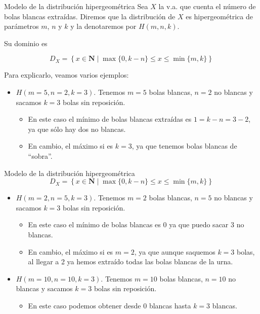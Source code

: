 \documentclass[
  ignorenonframetext,
  aspectratio=169]{beamer}
\providecommand{\tightlist}{%
  \setlength{\itemsep}{0pt}\setlength{\parskip}{0pt}}\usepackage{longtable,booktabs,array}
\begin{document}
\begin{frame}{Modelo de la distribución hipergeométrica}
\protect\hypertarget{modelo-de-la-distribuciuxf3n-hipergeomuxe9trica-3}{}
Sea \(X\) la v.a. que cuenta el número de bolas blancas extraídas.
Diremos que la distribución de \(X\) es hipergeométrica de parámetros
\(m\), \(n\) y \(k\) y la denotaremos por \(H(m,n,k)\).

Su dominio es

\[D_X=\left\{x\in\mathbf{N}\mid \max\{0,k-n\}\leq  x \leq \min\{m,k\}\right\}\]

Para explicarlo, veamos varios ejemplos:

\begin{itemize}
\tightlist
\item
  \(H(m=5,n=2,k=3)\). Tenemos \(m=5\) bolas blancas, \(n=2\) no blancas
  y sacamos \(k=3\) bolas sin reposición.

  \begin{itemize}
  \tightlist
  \item
    En este caso el mínimo de bolas blancas extraídas es \(1=k-n=3-2\),
    ya que sólo hay dos no blancas.
  \item
    En cambio, el máximo si es \(k=3\), ya que tenemos bolas blancas de
    ``sobra''.
  \end{itemize}
\end{itemize}
\end{frame}

\begin{frame}{Modelo de la distribución hipergeométrica}
\protect\hypertarget{modelo-de-la-distribuciuxf3n-hipergeomuxe9trica-4}{}
\[D_X=\left\{x\in\mathbf{N}\mid \max\{0,k-n\}\leq  x \leq \min\{m,k\}\right\}\]

\begin{itemize}
\tightlist
\item
  \(H(m=2,n=5,k=3)\). Tenemos \(m=2\) bolas blancas, \(n=5\) no blancas
  y sacamos \(k=3\) bolas sin reposición.

  \begin{itemize}
  \tightlist
  \item
    En este caso el mínimo de bolas blancas es \(0\) ya que puedo sacar
    3 no blancas.
  \item
    En cambio, el máximo si es \(m=2\), ya que aunque saquemos \(k=3\)
    bolas, al llegar a 2 ya hemos extraído todas las bolas blancas de la
    urna.
  \end{itemize}
\item
  \(H(m=10,n=10,k=3)\). Tenemos \(m=10\) bolas blancas, \(n=10\) no
  blancas y sacamos \(k=3\) bolas sin reposición.

  \begin{itemize}
  \tightlist
  \item
    En este caso podemos obtener desde \(0\) blancas hasta \(k=3\)
    blancas.
  \end{itemize}
\end{itemize}
\end{frame}
\end{document}
